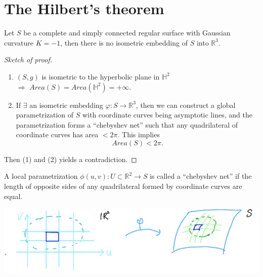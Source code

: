 \section{The Hilbert's theorem}
\begin{theorem}
    Let \(S\) be a complete and simply connected regular surface with
    Gaussian curvature \(K=-1\), then there is no isometric embedding of
    \(S\) into \(\mathbb{R}^3\).
\end{theorem}
\begin{proof}[Sketch of proof]
    \begin{enumerate}[(1)]
        \item \((S,g)\) is isometric to the hyperbolic plane in 
        \(\mathbb{H}^2\)\\
        \(\Rightarrow\) \(Area(S)=Area(\mathbb{H}^2)=+\infty\).
        \item If \(\exists\) an isometric embedding \(
            \varphi\colon S\to \mathbb{R}^3\), then we can construct a 
            global parametrization of \(S\) with coordinate curves being
            asymptotic lines, and the parametrization forms a
            ``chebyshev net'' such that any quadrilateral of coordinate
            curves has area \(<2\pi\). This implies 
            \[Area(S)<2\pi.\]
    \end{enumerate}
    Then (1) and (2) yields a contradiction.
\end{proof}
\begin{definition}
    A local parametrization \(\phi (u,v)\colon U\subset \mathbb{R}^2\to
    S\) is called a ``chebyshev net'' if the length of opposite sides of
    any quadrilateral formed by coordinate curves are equal.
\end{definition}
\includegraphics[scale=0.4]{picture/week15/chebyshev net.png}
